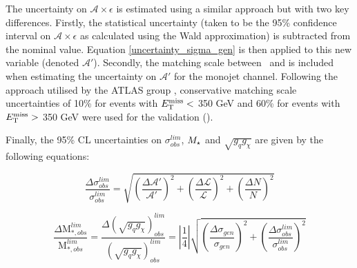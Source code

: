 
The uncertainty on $\mathcal{A} \times \epsilon$ is estimated using a similar approach but with two key differences. Firstly, the statistical uncertainty (taken to be the 95\% confidence interval on $\mathcal{A}\times\epsilon$ as calculated using the Wald approximation) is subtracted from the nominal value. Equation \ref{uncertainty_sigma_gen} is then applied to this new variable (denoted $\mathcal{A}'$). Secondly, the matching scale between \MG\mbox{ }and \PYTHIA is included when estimating the uncertainty on $\mathcal{A}'$ for the monojet channel. Following the approach utilised by the ATLAS group \cite{CERN-THESIS-2015-038}, conservative matching scale uncertainties of 10\% for events with $E_{\mathrm{T}}^{\mathrm{miss}} <$ 350 GeV and 60\% for events with $E_{\mathrm{T}}^{\mathrm{miss}} >$ 350 GeV were used for the validation ().


Finally, the 95\% CL uncertainties on $\sigma_{obs}^{lim}$, $M_{\star}$ and $\sqrt{g_q g_{\chi}}$ are given by the following equations:

\begin{equation}
\label{uncertainty_sigma_lim}
\frac{\Delta \sigma_{obs}^{lim}}{\sigma_{obs}^{lim}} = \sqrt{\left(\frac{\Delta \mathcal{A}'}{\mathcal{A}'}\right)^{2} + \left(\frac{\Delta \mathcal{L}}{\mathcal{L}}\right)^{2} + \left(\frac{\Delta N}{N}\right)^{2}}
\end{equation}

\begin{equation}
\label{uncertainty_M_star}
\frac{\Delta \mbox{M}_{*,obs}^{lim}}{\mbox{M}_{*,obs}^{lim}} = \frac{\Delta (\sqrt{g_{q}g_{\chi}})_{obs}^{lim}}{(\sqrt{g_{q}g_{\chi}})_{obs}^{lim}} = \left|\frac{1}{4}\right|\sqrt{\left(\frac{\Delta \sigma_{gen}}{\sigma_{gen}}\right)^{2} + \left(\frac{\Delta \sigma_{obs}^{lim}}{\sigma_{obs}^{lim}}\right)^{2}}
\end{equation}


\fi
